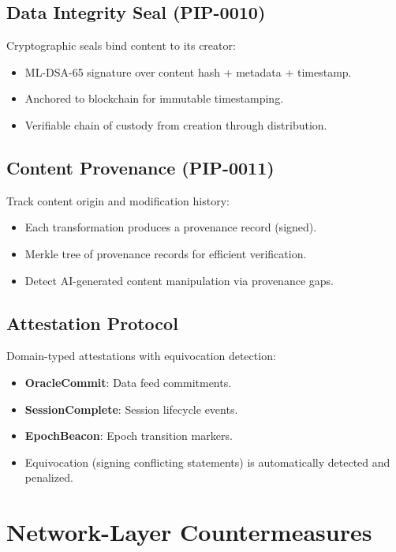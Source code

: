 \documentclass[11pt,letterpaper]{article}
\begin{document}
\subsection{Data Integrity Seal (PIP-0010)}

Cryptographic seals bind content to its creator:
\begin{itemize}
\item ML-DSA-65 signature over content hash + metadata + timestamp.
\item Anchored to blockchain for immutable timestamping.
\item Verifiable chain of custody from creation through distribution.
\end{itemize}

\subsection{Content Provenance (PIP-0011)}

Track content origin and modification history:
\begin{itemize}
\item Each transformation produces a provenance record (signed).
\item Merkle tree of provenance records for efficient verification.
\item Detect AI-generated content manipulation via provenance gaps.
\end{itemize}

\subsection{Attestation Protocol}

Domain-typed attestations with equivocation detection:
\begin{itemize}
\item \textbf{OracleCommit}: Data feed commitments.
\item \textbf{SessionComplete}: Session lifecycle events.
\item \textbf{EpochBeacon}: Epoch transition markers.
\item Equivocation (signing conflicting statements) is automatically detected and penalized.
\end{itemize}

\section{Network-Layer Countermeasures}
\end{document}
